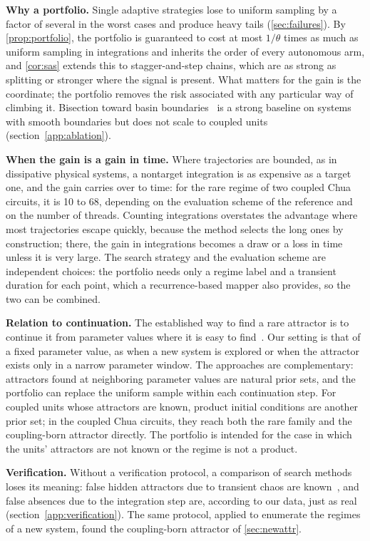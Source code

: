 \textbf{Why a portfolio.} Single adaptive strategies lose to uniform sampling by a factor of several in the worst cases and produce heavy tails (\cref{sec:failures}). By \cref{prop:portfolio}, the portfolio is guaranteed to cost at most $1/\theta$ times as much as uniform sampling in integrations and inherits the order of every autonomous arm, and \cref{cor:sas} extends this to stagger-and-step chains, which are as strong as splitting or stronger where the signal is present. What matters for the gain is the coordinate; the portfolio removes the risk associated with any particular way of climbing it. Bisection toward basin boundaries~\cite{NusseYorke1989,Skufca2006Edge} is a strong baseline on systems with smooth boundaries but does not scale to coupled units (section~\ref{app:ablation}).

\textbf{When the gain is a gain in time.} Where trajectories are bounded, as in dissipative physical systems, a nontarget integration is as expensive as a target one, and the gain carries over to time: for the rare regime of two coupled Chua circuits, it is 10 to 68, depending on the evaluation scheme of the reference and on the number of threads. Counting integrations overstates the advantage where most trajectories escape quickly, because the method selects the long ones by construction; there, the gain in integrations becomes a draw or a loss in time unless it is very large. The search strategy and the evaluation scheme are independent choices: the portfolio needs only a regime label and a transient duration for each point, which a recurrence-based mapper also provides, so the two can be combined.

\textbf{Relation to continuation.} The established way to find a rare attractor is to continue it from parameter values where it is easy to find~\cite{Brzeski2017,Datseris2023Framework,Datseris2026Global}. Our setting is that of a fixed parameter value, as when a new system is explored or when the attractor exists only in a narrow parameter window. The approaches are complementary: attractors found at neighboring parameter values are natural prior sets, and the portfolio can replace the uniform sample within each continuation step. For coupled units whose attractors are known, product initial conditions are another prior set; in the coupled Chua circuits, they reach both the rare family and the coupling-born attractor directly. The portfolio is intended for the case in which the units' attractors are not known or the regime is not a product.

\textbf{Verification.} Without a verification protocol, a comparison of search methods loses its meaning: false hidden attractors due to transient chaos are known~\cite{SprottMunmuangsaen2018Comment,Danca2016Transient}, and false absences due to the integration step are, according to our data, just as real (section~\ref{app:verification}). The same protocol, applied to enumerate the regimes of a new system, found the coupling-born attractor of \cref{sec:newattr}.

